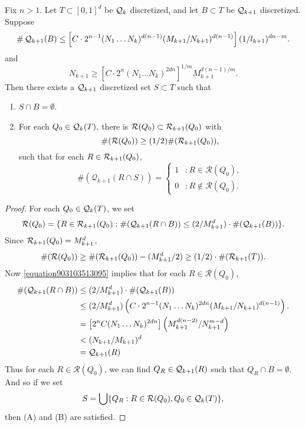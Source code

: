 \begin{lemma} \label{Lemma1209410535}
    Fix $n > 1$. Let $T \subset [0,1]^d$ be $\operatorname{\mathcal{Q}}_k$ discretized, and let $B \subset T$ be $\operatorname{\mathcal{Q}}_{k+1}$ discretized. Suppose
    \[ \# \operatorname{\mathcal{Q}}_{k+1}(B) \leq \left[ C \cdot 2^{n-1} (N_1 \dots N_k)^{d(n-1)} (M_{k+1}/N_{k+1})^{d(n-1)} \right] (1/l_{k+1})^{dn - m}. \]
    and
    \begin{equation} \label{equation903103513095}
        N_{k+1} \geq \left[ C \cdot 2^n (N_1 \dots N_k)^{2dn} \right]^{1/m} M_{k+1}^{d(n-1)/m}.
    \end{equation}
    Then there exists a $\operatorname{\mathcal{Q}}_{k+1}$ discretized set $S \subset T$ such that
    \begin{enumerate}
        \item $S \cap B = \emptyset$.
        \item \label{badsetproperty5} For each $Q_0 \in \operatorname{\mathcal{Q}}_k(T)$, there is $\mathcal{R}(Q_0) \subset \operatorname{\mathcal{R}}_{k+1}(Q_0)$ with
        \[ \#(\mathcal{R}(Q_0)) \geq (1/2) \#(\operatorname{\mathcal{R}}_{k+1}(Q_0)), \]
        such that for each $R \in \operatorname{\mathcal{R}}_{k+1}(Q_0)$,
        \[ \#(\mathcal{Q}_{k+1}(R \cap S)) = \begin{cases} 1 &: R \in \mathcal{R}(Q_0), \\ 0 &: R \not \in \mathcal{R}(Q_0). \end{cases} \]
    \end{enumerate}
\end{lemma}
\begin{proof}
    For each $Q_0 \in \operatorname{\mathcal{Q}}_k(T)$, we set
    \[ \mathcal{R}(Q_0) = \{ R \in \operatorname{\mathcal{R}}_{k+1}(Q_0) : \#(\operatorname{\mathcal{Q}}_{k+1}(R \cap B)) \leq (2/M_{k+1}^d) \cdot \#(\operatorname{\mathcal{Q}}_{k+1}(B)) \}. \]
    Since $\operatorname{\mathcal{R}}_{k+1}(Q_0) = M_{k+1}^d$,
    \[ \#(\mathcal{R}(Q_0)) \geq \#(\operatorname{\mathcal{R}}_{k+1}(Q_0)) - (M_{k+1}^d/2) \geq (1/2) \cdot \#(\operatorname{\mathcal{R}}_{k+1}(T)). \]
    Now \eqref{equation903103513095} implies that for each $R \in \mathcal{R}(Q_0)$,
    \begin{align*}
        \#(\operatorname{\mathcal{Q}}_{k+1}(R \cap B)) &\leq (2/M_{k+1}^d) \cdot \#(\operatorname{\mathcal{Q}}_{k+1}(B))\\
        &\leq (2/M_{k+1}^d) \left(C \cdot 2^{n-1} (N_1 \dots N_k)^{2dn} (M_{k+1}/N_{k+1})^{d(n-1)} \right).\\
        &= \left[ 2^n C (N_1 \dots N_k)^{2dn} \right] \left( M_{k+1}^{d(n-2)} / N_{k+1}^{m-d} \right)\\
        &< (N_{k+1}/M_{k+1})^d\\
        &= \operatorname{\mathcal{Q}}_{k+1}(R)
    \end{align*}
    Thus for each $R \in \mathcal{R}(Q_0)$, we can find $Q_R \in \operatorname{\mathcal{Q}}_{k+1}(R)$ such that $Q_R \cap B = \emptyset$. And so if we set
    \[ S = \bigcup \{ Q_R : R \in \mathcal{R}(Q_0), Q_0 \in \operatorname{\mathcal{Q}}_k(T) \}, \]
    then (A) and (B) are satisfied.
\end{proof}

